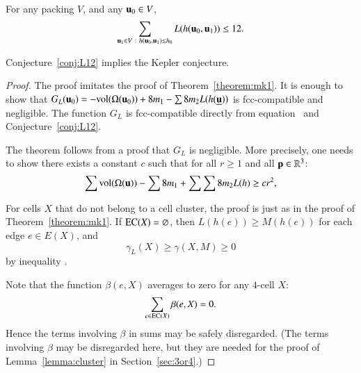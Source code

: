 \begin{conjecture}\label{conj:L12} For any packing $ V$, and
any $ {\mathbf u}_0\in V$, 
\begin{equation}\label{eqn:L12}
\sum_{ {\mathbf u}_1\in V\ :\  h( {\mathbf u}_0, {\mathbf u}_1)\le {h_0}} L(h( {\mathbf u}_0, {\mathbf u}_1)) \le 12.
\end{equation}
\end{conjecture}

\begin{theorem}\label{theorem:mk2}
Conjecture~\ref{conj:L12} implies the Kepler conjecture.
\end{theorem}

\begin{proof}  The proof imitates the proof of Theorem~\ref{theorem:mk1}.
It is enough to show that $G_L( {\mathbf u}_0)  = -{\operatorname{vol}}(\Omega( {\mathbf u}_0)) + 8 m_1 - \sum 8 m_2 L(h({\underline{{\mathbf u}}}))$ is fcc-compatible and negligible. 
The function $G_L$  is fcc-compatible directly
from equation~
and Conjecture~\ref{conj:L12}.  

The theorem follows from a proof that $G_L$ is negligible.  More precisely, one needs
to show there exists a constant  $c$ such that for all $r\ge 1$ and all ${\mathbf p}\in\mathbb{R}^3$:
\begin{equation}\label{eqn:A2neg}
  \sum {\operatorname{vol}}(\Omega( {\mathbf u})) -\sum 8m_1 + \sum \sum 8 m_2 L(h) \ge c r^2,
\end{equation}

For cells $X$ that do not belong to a cell cluster,
the proof is just as in the proof of Theorem~\ref{theorem:mk1}.
If ${\operatorname{EC}}(X)=\varnothing$, then 
$L(h(e))\ge M(h(e))$ for each edge $e\in E(X)$, and
$$\gamma_L(X)\ge \gamma(X,M)\ge 0$$ 
by inequality .

Note that the function $\beta(e,X)$ averages to zero for any $4$-cell $X$:
$$
\sum_{e\in {\operatorname{EC}}(X)} \beta(e,X) = 0.
$$
Hence the terms involving $\beta$ in sums may be safely disregarded.  (The terms involving
$\beta$ may be disregarded here, but they are needed for the proof of Lemma~\ref{lemma:cluster}  in Section~\ref{sec:3or4}.)


\end{proof}
